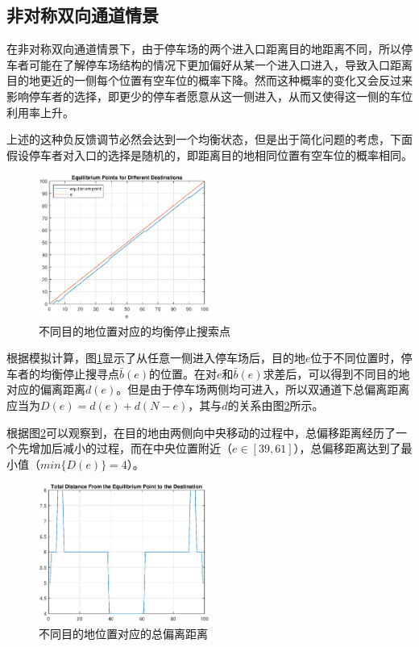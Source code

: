 \documentclass{thuemp}
\begin{document}
\subsection{非对称双向通道情景}
\par 在非对称双向通道情景下，由于停车场的两个进入口距离目的地距离不同，所以停车者可能在了解停车场结构的情况下更加偏好从某一个进入口进入，导致入口距离目的地更近的一侧每个位置有空车位的概率下降。然而这种概率的变化又会反过来影响停车者的选择，即更少的停车者愿意从这一侧进入，从而又使得这一侧的车位利用率上升。
\par 上述的这种负反馈调节必然会达到一个均衡状态，但是出于简化问题的考虑，下面假设停车者对入口的选择是随机的，即距离目的地相同位置有空车位的概率相同。

\begin{figure}[H]
    \centering
    \includegraphics[width=0.5\textwidth]{asymmetric_eq_to_e.eps}
    \caption{不同目的地位置对应的均衡停止搜索点}
    \label{fig:8}
\end{figure}

\par 根据模拟计算，图\ref{fig:8}显示了从任意一侧进入停车场后，目的地$e$位于不同位置时，停车者的均衡停止搜寻点$\bar{b}(e)$的位置。在对$e$和$\bar{b}(e)$求差后，可以得到不同目的地对应的偏离距离$d(e)$。但是由于停车场两侧均可进入，所以双通道下总偏离距离应当为$D(e)=d(e)+d(N-e)$，其与$d$的关系由图\ref{fig:9}所示。
\par 根据图\ref{fig:9}可以观察到，在目的地由两侧向中央移动的过程中，总偏移距离经历了一个先增加后减小的过程，而在中央位置附近（$e\in[39,61]$），总偏移距离达到了最小值（$min\{D(e)\}=4$）。



\begin{figure}[H]
    \centering
    \includegraphics[width=0.5\textwidth]{asymmetric_dstnc_to_e.eps}
    \caption{不同目的地位置对应的总偏离距离}
    \label{fig:9}
\end{figure}
\end{document}
